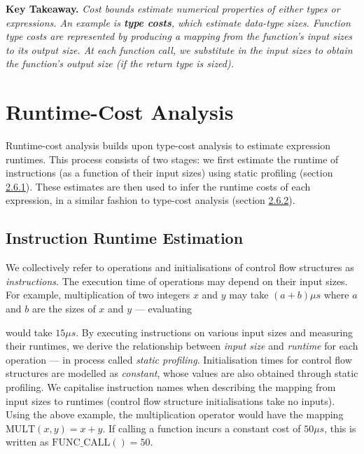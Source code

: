 \vspace{1mm}

\textbf{Key Takeaway.} \textit{Cost bounds estimate numerical properties of either types or expressions. An example is \textbf{type costs}, which estimate data-type sizes. Function type costs are represented by producing a mapping from the function's input sizes to its output size. At each function call, we substitute in the input sizes to obtain the function's output size (if the return type is sized).}

\section{Runtime-Cost Analysis}

\label{sec:2.6}

Runtime-cost analysis builds upon type-cost analysis to estimate expression runtimes. This process consists of two stages: we first estimate the runtime of instructions (as a function of their input sizes) using static profiling (section \hyperref[sec:2.6.1]{2.6.1}). These estimates are then used to infer the runtime costs of each expression, in a similar fashion to type-cost analysis (section \hyperref[sec:2.6.2]{2.6.2}).

\vspace{-1mm}

\subsection{Instruction Runtime Estimation}

\label{sec:2.6.1}

We collectively refer to operations and initialisations of control flow structures as \textit{instructions}. The execution time of operations may depend on their input sizes. For example, multiplication of two integers \( x \) and \( y \) may take \( (a + b) \mu s \) where \( a \) and \( b \) are the sizes of \( x \) and \( y \) --- evaluating  would take \( 15 \mu s \). By executing instructions on various input sizes and measuring their runtimes, we derive the relationship between \textit{input size} and \textit{runtime} for each operation --- in process called \textit{static profiling}. Initialisation times for control flow structures are modelled as \textit{constant}, whose values are also obtained through static profiling. We capitalise instruction names when describing the mapping from input sizes to runtimes (control flow structure initialisations take no inputs). Using the above example, the multiplication operator would have the mapping \( { \text{MULT}(x, y) = x + y } \). If calling a function incurs a constant cost of \( 50 \mu s\), this is written as \( { \text{FUNC\_CALL}() = 50 } \).

